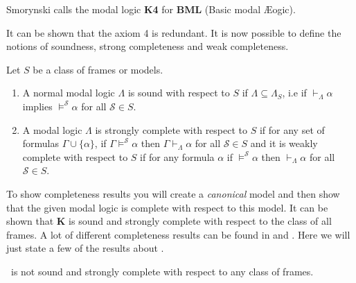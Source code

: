 \documentclass[../main.tex]{subfiles}
\begin{document}
\begin{remark}
	Smorynski calls the modal logic \textbf{K4} for \textbf{BML} (Basic
	modal Æogic).
\end{remark}


It can be shown that the axiom 4 is redundant.
It is now possible to define the notions of soundness, strong completeness and
weak completeness.
\begin{defi}
	Let $S$ be a class of frames or models.
	\begin{enumerate}
		\item A normal modal logic $\Lambda$ is sound with respect to $S$ if
		$\Lambda\subseteq\Lambda_S$, i.e if $\vdash_\Lambda\alpha$
		implies $\vDash^\mathcal{S}\alpha$ for all $\mathcal{S}\in S$.
	\item A modal logic $\Lambda$ is strongly complete with respect to $S$
		if for any set of formulas $\Gamma\cup\{\alpha\}$, if
		$\Gamma\vDash^\mathcal{S}\alpha$ then
		$\Gamma\vdash_\Lambda\alpha$ for all $\mathcal{S}\in S$ and it
		is weakly complete with respect to $S$ if for any formula
		$\alpha$ if $\vDash^\mathcal{S}\alpha$ then
		$\vdash_\Lambda\alpha$ for all $\mathcal{S}\in S$.
	\end{enumerate}
\end{defi}
To show completeness results you will create a \textit{canonical} model and
then show that the given modal logic is complete with respect to this model. It
can be shown that \textbf{K} is sound and strongly complete with respect to the
class of all frames. A lot of different completeness results can be found in
\parencite{Lemmon1977} and \cite{Blackburn2002}. Here we will just state a few of
the results about \GL.

\begin{thm}
	\GL\ is not sound and strongly complete with respect to any class of
	frames.
\end{thm}
\end{document}
